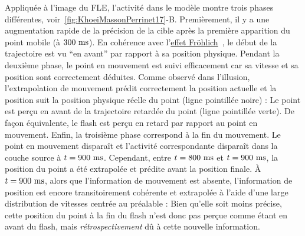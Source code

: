 Appliquée à l'image du FLE, l'activité dans le modèle montre trois
phases différentes, voir~\ref{fig:KhoeiMassonPerrinet17}-B. Premièrement, il y a une
augmentation rapide de la précision de la cible après la première
apparition du point mobile (à $300~\si{\milli\second}$). En cohérence avec
l'\href{https://en.wikipedia.org/wiki/Fröhlich_effect}{effet Fröhlich}~\citep{Jancke10}, le début de la trajectoire est vu ``en avant'' par rapport à sa
position physique. Pendant la deuxième phase, le point en mouvement est
suivi efficacement car sa vitesse et sa position sont correctement
déduites. Comme observé dans l'illusion, l'extrapolation de mouvement prédit correctement la
position actuelle et la position suit la position physique réelle du
point (ligne pointillée noire) : Le point est perçu en avant de la trajectoire retardée du point (ligne
pointillée verte).
De façon équivalente, le flash est perçu en retard par rapport au point en mouvement.
Enfin, la troisième phase correspond à
la fin du mouvement. Le point en mouvement disparaît et
l'activité correspondante disparaît dans la couche source à $t=900~\si{\milli\second}$.
Cependant, entre $t=800~\si{\milli\second}$ et $t=900~\si{\milli\second}$, la position du point a été
extrapolée et prédite avant la position finale. À $t=900~\si{\milli\second}$, alors que
l'information de mouvement est absente, l'information de position est
encore transitoirement cohérente et extrapolée à l'aide d'une large
distribution de vitesses centrée au préalable : Bien qu'elle soit moins
précise, cette position du point à la fin du flash n'est donc pas perçue comme étant en avant du flash, mais \emph{rétrospectivement} dû à cette nouvelle information.

